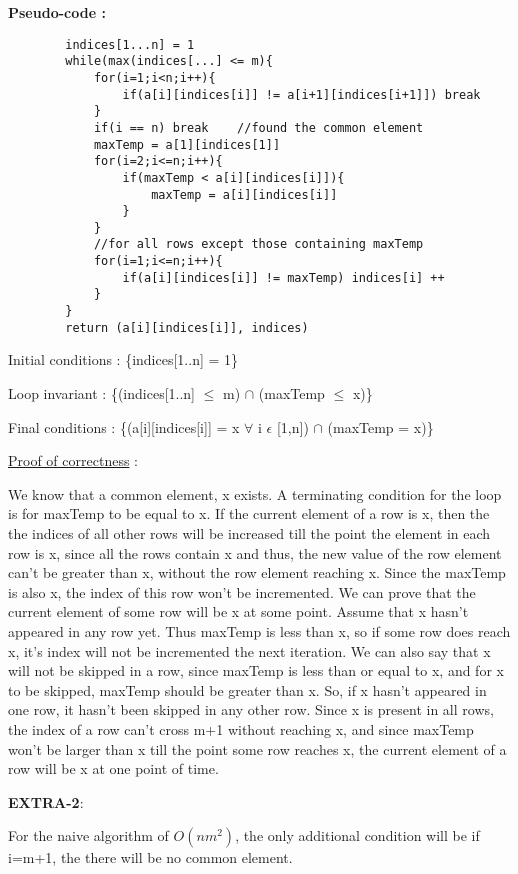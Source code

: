 \documentclass[12pt]{article}
\begin{document}
\begin{enumerate}
    \textbf{Pseudo-code :}
    \begin{verbatim}
        indices[1...n] = 1
        while(max(indices[...] <= m){
            for(i=1;i<n;i++){
                if(a[i][indices[i]] != a[i+1][indices[i+1]]) break
            }
            if(i == n) break    //found the common element
            maxTemp = a[1][indices[1]]
            for(i=2;i<=n;i++){
                if(maxTemp < a[i][indices[i]]){
                    maxTemp = a[i][indices[i]]
                }
            }
            //for all rows except those containing maxTemp
            for(i=1;i<=n;i++){
                if(a[i][indices[i]] != maxTemp) indices[i] ++
            }
        }
        return (a[i][indices[i]], indices)
    \end{verbatim}
    Initial conditions : \{indices[1..n] = 1\}
    
    Loop invariant : \{(indices[1..n] $\leq$ m) $\cap$ (maxTemp $\leq$ x)\}
    
    Final conditions : \{(a[i][indices[i]] = x $\forall$ i $\epsilon$ [1,n]) $\cap$ (maxTemp = x)\}
    
    \underline{Proof of correctness} :
    
    We know that a common element, x exists. A terminating condition for the loop is for maxTemp to be equal to x. If the current element of a row is x, then the the indices of all other rows will be increased till the point the element in each row is x, since all the rows contain x and thus, the new value of the row element can't be greater than x, without the row element reaching x. Since the maxTemp is also x, the index of this row won't be incremented. We can prove that the current element of some row will be x at some point. Assume that x hasn't appeared in any row yet. Thus maxTemp is less than x, so if some row does reach x, it's index will not be incremented the next iteration. We can also say that x will not be skipped in a row, since maxTemp is less than or equal to x, and for x to be skipped, maxTemp should be greater than x. So, if x hasn't appeared in one row, it hasn't been skipped in any other row. Since x is present in all rows, the index of a row can't cross m+1 without reaching x, and since maxTemp won't be larger than x till the point some row reaches x, the current element of a row will be x at one point of time.
    
    \textbf{EXTRA-2}: 
    
    For the naive algorithm of $O(nm^2)$, the only additional condition will be if i=m+1, the there will be no common element.
    

\end{enumerate}
\end{document}
